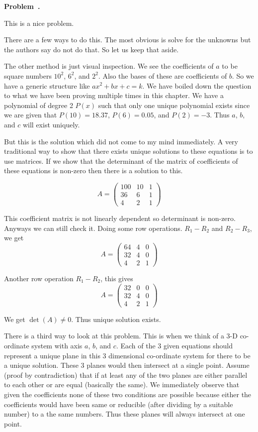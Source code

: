 \documentclass[10pt]{article}
\newcounter{problem}
\newenvironment{problem}[1][]{
  \refstepcounter{problem}
  \par\noindent\textbf{Problem~\theproblem. #1}\par
  \vspace{0.5em}
}{\vspace{1em}}
\begin{document}
\begin{problem} %
  This is a nice problem.

  There are a few ways to do this. The most obvious is solve for the unknowns but the authors say do not do that. So let us keep
  that aside.

  The other method is just visual inspection. We see the coefficients of $a$ to be square numbers $10^2$, $6^2$, and $2^2$. Also the bases 
  of these are coefficients of $b$. So we have a generic structure like $ax^2 + bx + c = k$. We have boiled down the question to what we have been 
  proving multiple times in this chapter. We have a polynomial of degree 2 $P(x)$ such that only one unique polynomial exists since we are given that 
  $P(10) = 18.37$, $P(6) = 0.05$, and $P(2) = -3$. Thus $a$, $b$, and $c$ will exist uniquely.

  But this is the solution which did not come to my mind immediately. A very traditional way to show that there exists unique solutions to 
  these equations is to use matrices. If we show that the determinant of the matrix of coefficients of these equations is non-zero then there is a solution to this. 

  \[
  A = 
  \begin{pmatrix}
    100 & 10 & 1\\
    36 & 6 & 1\\
    4 & 2 & 1
  \end{pmatrix}
  \]

  This coefficient matrix is not linearly dependent so determinant is non-zero. Anyways we can still check it. Doing some row operations.
  $R_1 - R_2$ and $R_2 - R_3$, we get 
  \[
  A = 
  \begin{pmatrix}
    64 & 4 & 0\\
    32 & 4 & 0\\
    4 & 2 & 1
  \end{pmatrix}
  \]

  Another row operation $R_1 - R_2$, this gives 
  \[
  A = 
  \begin{pmatrix}
    32 & 0 & 0\\
    32 & 4 & 0\\
    4 & 2 & 1
  \end{pmatrix}
  \]

  We get $\det(A) \neq 0$. Thus unique solution exists.

  There is a third way to look at this problem. This is when we think of a 3-D co-ordinate system with axis $a$, $b$, and $c$. Each of 
  the 3 given equations should represent a unique plane in this 3 dimensional co-ordinate system for there to be a unique solution. These 3 planes 
  would then intersect at a single point. Assume (proof by contradiction) that if at least any of the two planes are either parallel to each other 
  or are equal (basically the same). We immediately observe that given the coefficients none of these two conditions are possible because either the 
  coefficients would have been same or reducible (after dividing by a suitable number) to a the same numbers. Thus these planes will always 
  intersect at one point.


\end{problem}
\end{document}
